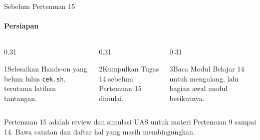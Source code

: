 \documentclass[t]{beamer}
\begin{document}
\begin{frame}{Sebelum Pertemuan 15}
\framesubtitle{Persiapan}
\begin{columns}[T]
\begin{column}{0.31\textwidth}
\begin{Langkah}{1}{Selesaikan}
Hands-on yang belum lulus \texttt{cek.sh}, terutama latihan tantangan.
\end{Langkah}
\end{column}
\begin{column}{0.31\textwidth}
\begin{Langkah}{2}{Kumpulkan}
Tugas 14 sebelum Pertemuan 15 dimulai.
\end{Langkah}
\end{column}
\begin{column}{0.31\textwidth}
\begin{Langkah}{3}{Baca}
Modul Belajar 14 untuk mengulang, lalu bagian awal modul berikutnya.
\end{Langkah}
\end{column}
\end{columns}
\vspace{10pt}
Pertemuan 15 adalah review dan simulasi UAS untuk materi Pertemuan 9 sampai 14. Bawa catatan dan daftar hal yang masih membingungkan.
\end{frame}

\end{document}
